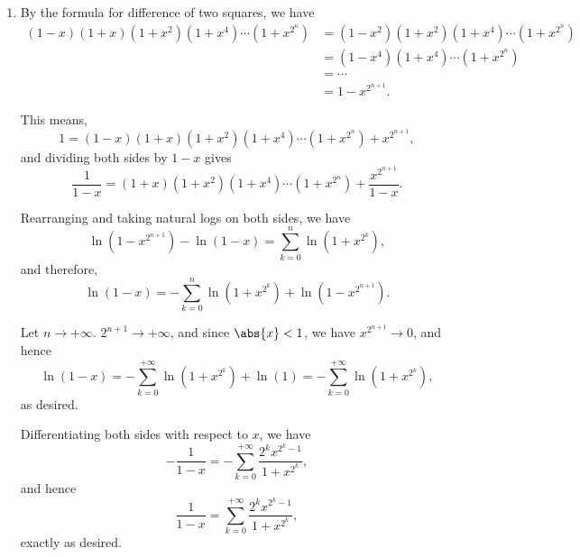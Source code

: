 \Question{\currfilebase}

\begin{enumerate}
    \item By the formula for difference of two squares, we have
          \begin{align*}
              (1 - x)(1 + x)(1 + x^2)(1 + x^4) \cdots (1 + x^{2^n}) & = (1 - x^2)(1 + x^2)(1 + x^4) \cdots (1 + x^{2^n}) \\
                                                                    & = (1 - x^4)(1 + x^4) \cdots (1 + x^{2^n})          \\
                                                                    & = \cdots                                           \\
                                                                    & = 1 - x^{2^{n + 1}}.
          \end{align*}

          This means,
          \[
              1 = (1 - x)(1 + x)(1 + x^2)(1 + x^4) \cdots (1 + x^{2^n}) + x^{2^{n + 1}},
          \]
          and dividing both sides by \(1 - x\) gives
          \[
              \frac{1}{1 - x} = (1 + x)(1 + x^2)(1 + x^4) \cdots (1 + x^{2^n}) + \frac{x^{2^{n + 1}}}{1 - x}.
          \]

          Rearranging and taking natural logs on both sides, we have
          \[
              \ln(1 - x^{2^{n + 1}}) - \ln(1 - x) = \sum_{k = 0}^{n} \ln(1 + x^{2^{k}}),
          \]
          and therefore,
          \[
              \ln(1 - x) = -\sum_{k = 0}^{n} \ln(1 + x^{2^{k}}) + \ln(1 - x^{2^{n + 1}}).
          \]

          Let \(n \to +\infty\). \(2^{n + 1} \to +\infty\), and since \(\abs{x} < 1\), we have \(x^{2^{n + 1}} \to 0\), and hence
          \[
              \ln(1 - x) = -\sum_{k = 0}^{+\infty} \ln(1 + x^{2^{k}}) + \ln(1) = -\sum_{k = 0}^{+\infty} \ln(1 + x^{2^{k}}),
          \]
          as desired.

          Differentiating both sides with respect to \(x\), we have
          \[
              - \frac{1}{1 - x} = - \sum_{k = 0}^{+\infty} \frac{2^k x^{2^k - 1}}{1 + x^{2^k}},
          \]
          and hence
          \[
              \frac{1}{1 - x} = \sum_{k = 0}^{+\infty} \frac{2^k x^{2^k - 1}}{1 + x^{2^k}},
          \]
          exactly as desired.


\end{enumerate}
